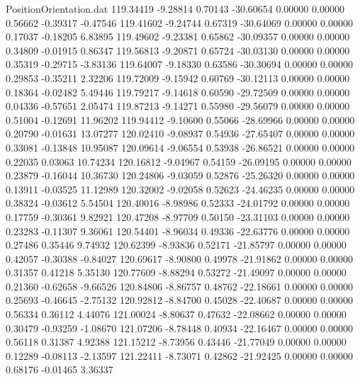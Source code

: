 \begin{filecontents}{PositionOrientation.dat}
 119.34419   -9.28814    0.70143   -30.60654    0.00000    0.00000    0.56662   -0.39317   -0.47546
 119.41602   -9.24744    0.67319   -30.64069    0.00000    0.00000    0.17037   -0.18205    6.83895
 119.49602   -9.23381    0.65862   -30.09357    0.00000    0.00000    0.34809   -0.01915    0.86347
 119.56813   -9.20871    0.65724   -30.03130    0.00000    0.00000    0.35319   -0.29715   -3.83136
 119.64007   -9.18330    0.63586   -30.30694    0.00000    0.00000    0.29853   -0.35211    2.32206
 119.72009   -9.15942    0.60769   -30.12113    0.00000    0.00000    0.18364   -0.02482    5.49446
 119.79217   -9.14618    0.60590   -29.72509    0.00000    0.00000    0.04336   -0.57651    2.05474
 119.87213   -9.14271    0.55980   -29.56079    0.00000    0.00000    0.51004   -0.12691   11.96202
 119.94412   -9.10600    0.55066   -28.69966    0.00000    0.00000    0.20790   -0.01631   13.07277
 120.02410   -9.08937    0.54936   -27.65407    0.00000    0.00000    0.33081   -0.13848   10.95087
 120.09614   -9.06554    0.53938   -26.86521    0.00000    0.00000    0.22035    0.03063   10.74234
 120.16812   -9.04967    0.54159   -26.09195    0.00000    0.00000    0.23879   -0.16044   10.36730
 120.24806   -9.03059    0.52876   -25.26320    0.00000    0.00000    0.13911   -0.03525   11.12989
 120.32002   -9.02058    0.52623   -24.46235    0.00000    0.00000    0.38324   -0.03612    5.54504
 120.40016   -8.98986    0.52333   -24.01792    0.00000    0.00000    0.17759   -0.30361    9.82921
 120.47208   -8.97709    0.50150   -23.31103    0.00000    0.00000    0.23283   -0.11307    9.36061
 120.54401   -8.96034    0.49336   -22.63776    0.00000    0.00000    0.27486    0.35446    9.74932
 120.62399   -8.93836    0.52171   -21.85797    0.00000    0.00000    0.42057   -0.30388   -0.84027
 120.69617   -8.90800    0.49978   -21.91862    0.00000    0.00000    0.31357    0.41218    5.35130
 120.77609   -8.88294    0.53272   -21.49097    0.00000    0.00000    0.21360   -0.62658   -9.66526
 120.84806   -8.86757    0.48762   -22.18661    0.00000    0.00000    0.25693   -0.46645   -2.75132
 120.92812   -8.84700    0.45028   -22.40687    0.00000    0.00000    0.56334    0.36112    4.44076
 121.00024   -8.80637    0.47632   -22.08662    0.00000    0.00000    0.30479   -0.93259   -1.08670
 121.07206   -8.78448    0.40934   -22.16467    0.00000    0.00000    0.56118    0.31387    4.92388
 121.15212   -8.73956    0.43446   -21.77049    0.00000    0.00000    0.12289   -0.08113   -2.13597
 121.22411   -8.73071    0.42862   -21.92425    0.00000    0.00000    0.68176   -0.01465    3.36337

\end{filecontents}
